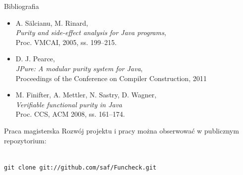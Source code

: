 \documentclass[handout]{beamer}
\begin{document}
\begin{frame}{Bibliografia}
  \begin{itemize}
  \item A. S\u{a}lcianu, M. Rinard, \\
    \emph{Purity and side-effect analysis for Java programs}, \\
         Proc. VMCAI, 2005, ss. 199--215.
  \item D. J. Pearce, \\
    \emph{JPure: A modular purity system for Java}, \\
    Proceedings of the Conference on Compiler Construction, 2011
  \item M. Finifter, A. Mettler, N. Sastry, D. Wagner, \\
    \emph{Verifiable functional purity in Java} \\
    Proc. CCS, ACM 2008, ss. 161--174.
  \end{itemize}
\end{frame}

\begin{frame}{Praca magisterska}
  Rozwój projektu i pracy można obserwować w publicznym repozytorium:
  \begin{center}
    \vspace{3mm}
    \\
    \vspace{3mm}
    \texttt{git clone git://github.com/saf/Funcheck.git}
  \end{center}
\end{frame}
\end{document}
